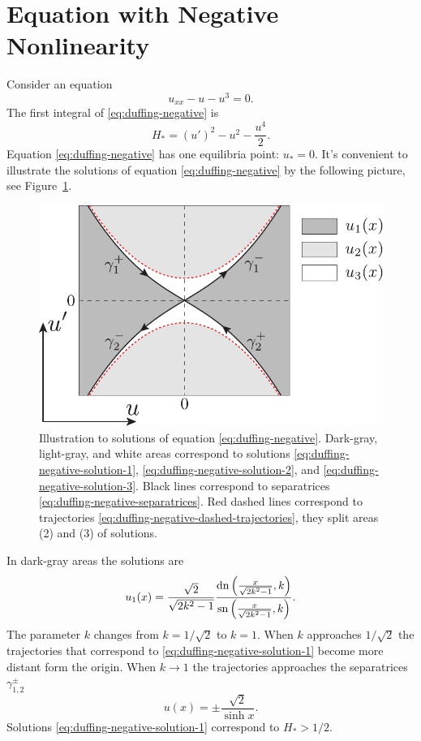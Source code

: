 \section{Equation with Negative Nonlinearity}

Consider an equation
\begin{equation}
	u_{xx} - u - u^3 = 0.
\label{eq:duffing-negative}
\end{equation}
The first integral of \eqref{eq:duffing-negative} is
\begin{equation}
	H_* = (u')^2 - u^2 - \frac{u^4}{2}.
\end{equation}
Equation \eqref{eq:duffing-negative} has one equilibria point: $u_* = 0$.
It's convenient to illustrate the solutions of equation \eqref{eq:duffing-negative} by the following picture, see Figure~\ref{fig:duffing-negative}.
\begin{figure}[h]
\centering
	\includegraphics[scale = 1]{pic/duffing negative illustration}
	\caption{
		Illustration to solutions of equation \eqref{eq:duffing-negative}.
		Dark-gray, light-gray, and white areas correspond to solutions \eqref{eq:duffing-negative-solution-1}, \eqref{eq:duffing-negative-solution-2}, and \eqref{eq:duffing-negative-solution-3}.
		Black lines correspond to separatrices \eqref{eq:duffing-negative-separatrices}.
		Red dashed lines correspond to trajectories \eqref{eq:duffing-negative-dashed-trajectories}, they split areas (2) and (3) of solutions.
	}
\label{fig:duffing-negative}
\end{figure}

In dark-gray areas the solutions are
\begin{equation}
	u_1(x) = \frac{\sqrt{2}}{\sqrt{2k^2 - 1}} \frac{\mathop\mathrm{dn} \left( \frac{x}{\sqrt{2k^2 - 1}}, k \right)}{\mathop\mathrm{sn} \left( \frac{x}{\sqrt{2k^2 - 1}}, k \right)}.
\label{eq:duffing-negative-solution-1}
\end{equation}
The parameter $k$ changes from $k = 1 / \sqrt{2}$ to $k = 1$.
When $k$ approaches $1 / \sqrt{2}$ the trajectories that correspond to \eqref{eq:duffing-negative-solution-1} become more distant form the origin.
When $k \to 1$ the trajectories approaches the separatrices $\gamma_{1, 2}^{\pm}$
\begin{equation}
	u(x) = \pm \frac{\sqrt{2}}{\sinh x}.
\label{eq:duffing-negative-separatrices}
\end{equation}
Solutions \eqref{eq:duffing-negative-solution-1} correspond to $H_* > 1/2$.


